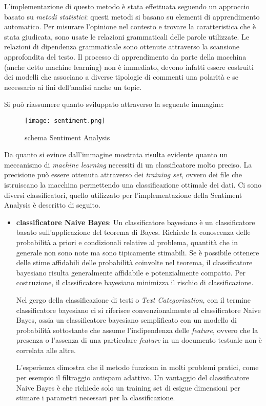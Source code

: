L'implementazione di questo metodo è stata effettuata seguendo un approccio basato su \textit{metodi statistici}: questi metodi si basano su elementi di apprendimento automatico. Per misurare l'opinione nel contesto e trovare la caratteristica che è stata giudicata, sono usate le relazioni grammaticali delle parole utilizzate. Le relazioni di dipendenza grammaticale sono ottenute attraverso la scansione approfondita del testo. Il processo di apprendimento da parte della macchina (anche detto machine learning) non è immediato, devono infatti essere costruiti dei modelli che associano a diverse tipologie di commenti una polarità e se necessario ai fini dell'analisi anche un topic.

Si può riassumere quanto sviluppato attraverso la seguente immagine:
\begin{figure}[!h]
    \begin{center}
      \texttt{[image: sentiment.png]}
	\caption{schema Sentiment Analysis}
    \end{center}
  \end{figure}
 
 Da quanto si evince dall'immagine mostrata risulta evidente quanto un meccanismo di \textit{machine learning} necessiti di un classificatore molto preciso. La precisione può essere ottenuta attraverso dei \textit{training set}, ovvero dei file che istruiscano la macchina permettendo una classificazione ottimale dei dati.
Ci sono diversi classificatori, quello utilizzato per l'implementazione della Sentiment Analysis è descritto di seguito.
\begin{itemize}
\item \textbf{classificatore Naive Bayes}:
Un classificatore bayesiano è un classificatore basato sull'applicazione del teorema di Bayes.
Richiede la conoscenza delle probabilità a priori e condizionali relative al problema, quantità che in generale non sono note ma sono tipicamente stimabili. Se è possibile ottenere delle stime affidabili delle probabilità coinvolte nel teorema, il classificatore bayesiano risulta generalmente affidabile e potenzialmente compatto. Per costruzione, il classificatore bayesiano minimizza il rischio di classificazione.

Nel gergo della classificazione di testi o \textit{Text Categorization}, con il termine classificatore bayesiano ci si riferisce convenzionalmente al classificatore Naive Bayes, ossia un classificatore bayesiano semplificato con un modello di probabilità sottostante che assume l'indipendenza delle \textit{feature}, ovvero che la presenza o l'assenza di una particolare \textit{feature} in un documento testuale non è correlata alle altre.

L'esperienza dimostra che il metodo funziona in molti problemi pratici, come per esempio il filtraggio antispam adattivo. Un vantaggio del classificatore Naive Bayes è che richiede solo un training set di esigue dimensioni per stimare i parametri necessari per la classificazione.

\end{itemize}

